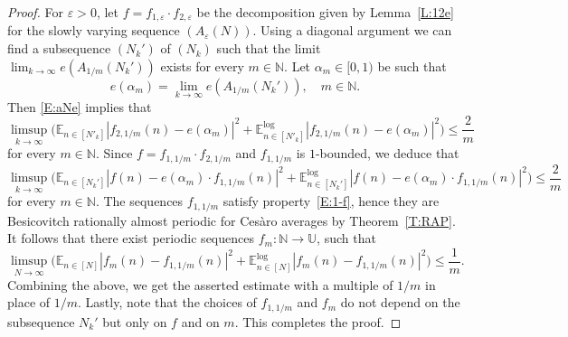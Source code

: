 \documentclass[11pt]{amsart}
\newtheorem{corollary}[lemma]{Corollary}
\theoremstyle{definition}
\newcommand{\lE}{\mathbb{E}^{\log}}
\newcommand{\E}{{\mathbb E}}
\newcommand{\N}{{\mathbb N}}
\newcommand{\U}{{\mathbb U}}
\begin{document}
\begin{proof}
	  For $\varepsilon>0$, let $f=f_{1,\varepsilon}\cdot f_{2,\varepsilon}$ be the decomposition given by Lemma~\ref{L:12e}    for the slowly varying sequence $(A_\varepsilon(N))$.  Using a diagonal argument we can find a subsequence $(N_k')$ of $(N_k)$ such that the  limit
$\lim_{k\to\infty} e(A_{1/m}(N_k'))$ exists for every $m\in \N$. Let $\alpha_m\in [0,1)$ be such that
$$
e(\alpha_m)=\lim_{k\to\infty} e(A_{1/m}(N_k')), \quad m\in \N.
$$
Then  \eqref{E:aNe} implies that
$$
	\limsup_{k\to\infty}\big(\E_{n\in [N'_k]}|f_{2,1/m}(n)-e(\alpha_m)|^2+ \lE_{n\in [N'_k]}|f_{2,1/m}(n)-e(\alpha_m)|^2\big)
	\leq \frac{2}{m}
$$
for every $m\in\N$.
Since  	$f=f_{1,1/m}\cdot f_{2,1/m}$ and  $f_{1,1/m}$ is $1$-bounded,  we deduce that
$$
\limsup_{k\to\infty} \big(\E_{n\in [N_k']}|f(n)-e(\alpha_m)\cdot f_{1,1/m}(n)|^2+
 \lE_{n\in [N_k']}|f(n)-e(\alpha_m)\cdot f_{1,1/m}(n)|^2\big)\leq \frac{2}{m}
$$
for every $m\in \N$.
 The sequences $f_{1,1/m}$  satisfy property~\eqref{E:1-f}, hence they are Besicovitch rationally almost periodic for Ces\`aro averages by Theorem~\ref{T:RAP}.  It follows that  there exist periodic sequences $f_m\colon \N\to \U$,
such that
$$
\limsup_{N\to\infty}\big(\E_{n\in[N]} |f_m(n)-f_{1,1/m}(n)|^2+\lE_{n\in[N]} |f_m(n)-f_{1,1/m}(n)|^2\big)\leq \frac{1}{m}.
$$
Combining the above, we get the asserted estimate with a multiple of $1/m$ in place of $1/m$.
Lastly, note that the choices of $f_{1,1/m}$ and  $f_m$ do not depend on the subsequence $N_k'$ but only on $f$ and on $m$.
This completes the proof.
\end{proof}
\end{document}
